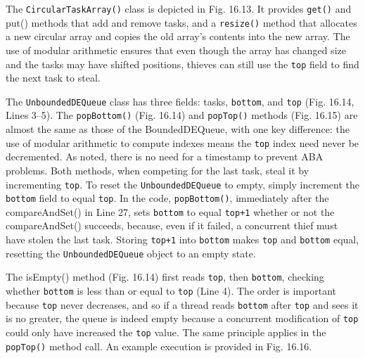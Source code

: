 The \lstinline!CircularTaskArray()! class is depicted in
Fig. 16.13. It provides \lstinline!get()! and put() methods that add
and remove tasks, and a \lstinline!resize()! method that allocates a
new circular array and copies the old array's contents into the new
array. The use of modular arithmetic ensures that even though the
array has changed size and the tasks may have shifted positions,
thieves can still use the \lstinline!top! field to find the next task
to steal.

The \lstinline!UnboundedDEQueue! class has three fields: tasks,
\lstinline!bottom!, and \lstinline!top! (Fig. 16.14, Lines 3–5). The
\lstinline!popBottom()! (Fig. 16.14) and \lstinline!popTop()! methods
(Fig. 16.15) are almost the same as those of the BoundedDEQueue, with
one key difference: the use of modular arithmetic to compute indexes
means the \lstinline!top! index need never be decremented. As noted,
there is no need for a timestamp to prevent ABA problems. Both
methods, when competing for the last task, steal it by incrementing
\lstinline!top!. To reset the \lstinline!UnboundedDEQueue! to empty,
simply increment the \lstinline!bottom! field to equal
\lstinline!top!. In the code, \lstinline!popBottom()!, immediately
after the compareAndSet() in Line 27, sets \lstinline!bottom! to equal
\lstinline!top+1! whether or not the compareAndSet() succeeds,
because, even if it failed, a concurrent thief must have stolen the
last task. Storing \lstinline!top+1! into \lstinline!bottom! makes
\lstinline!top! and \lstinline!bottom! equal, resetting the
\lstinline!UnboundedDEQueue! object to an empty state.

The isEmpty() method (Fig. 16.14) first reads \lstinline!top!, then
\lstinline!bottom!, checking whether \lstinline!bottom! is less than
or equal to \lstinline!top! (Line 4). The order is important because
\lstinline!top! never decreases, and so if a thread reads
\lstinline!bottom! after \lstinline!top! and sees it is no greater,
the queue is indeed empty because a concurrent modification of
\lstinline!top! could only have increased the \lstinline!top!
value. The same principle applies in the \lstinline!popTop()! method
call. An example execution is provided in Fig. 16.16.

